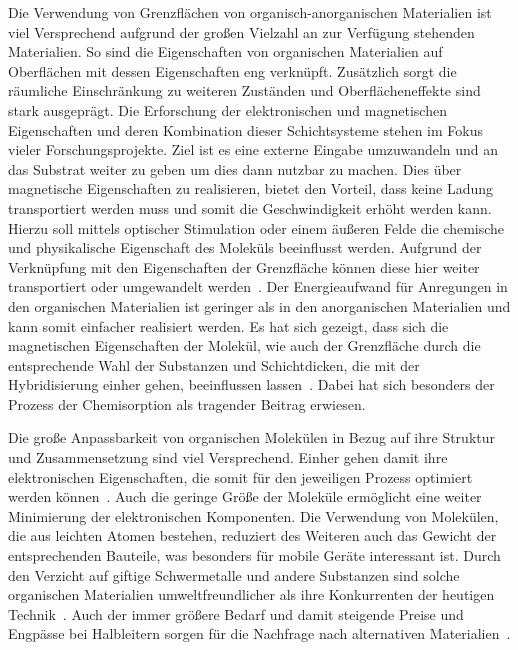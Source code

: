     Die Verwendung von Grenzflächen von organisch-anorganischen Materialien ist viel Versprechend aufgrund der großen Vielzahl an zur Verfügung stehenden Materialien.
    So sind die Eigenschaften von organischen Materialien auf Oberflächen mit dessen Eigenschaften eng verknüpft.
    Zusätzlich sorgt die räumliche Einschränkung zu weiteren Zuständen und Oberflächeneffekte sind stark ausgeprägt.
    Die Erforschung der elektronischen und magnetischen Eigenschaften und deren Kombination dieser Schichtsysteme stehen im Fokus vieler Forschungsprojekte.
    Ziel ist es eine externe Eingabe umzuwandeln und an das Substrat weiter zu geben um dies dann nutzbar zu machen.
    Dies über magnetische Eigenschaften zu realisieren, bietet den Vorteil, dass keine Ladung transportiert werden muss und somit die Geschwindigkeit erhöht werden kann.
    Hierzu soll mittels optischer Stimulation oder einem äußeren Felde die chemische und physikalische Eigenschaft des Moleküls beeinflusst werden.
    Aufgrund der Verknüpfung mit den Eigenschaften der Grenzfläche können diese hier weiter transportiert oder umgewandelt werden~\cite{IF_16}.
    Der Energieaufwand für Anregungen in den organischen Materialien ist geringer als in den anorganischen Materialien und kann somit einfacher realisiert werden.
    Es hat sich gezeigt, dass sich die magnetischen Eigenschaften der Molekül, wie auch der Grenzfläche durch die entsprechende Wahl der Substanzen und Schichtdicken, die mit der Hybridisierung einher gehen, beeinflussen lassen~\cite{IF_16}.
    Dabei hat sich besonders der Prozess der Chemisorption als tragender Beitrag erwiesen.

    Die große Anpassbarkeit von organischen Molekülen in Bezug auf ihre Struktur und Zusammensetzung sind viel Versprechend.
    Einher gehen damit ihre elektronischen Eigenschaften, die somit für den jeweiligen Prozess optimiert werden können~\cite{scholl_chapter_2018}.
    Auch die geringe Größe der Moleküle ermöglicht eine weiter Minimierung der elektronischen Komponenten.
    Die Verwendung von Molekülen, die aus leichten Atomen bestehen, reduziert des Weiteren auch das Gewicht der entsprechenden Bauteile, was besonders für mobile Geräte interessant ist.
    Durch den Verzicht auf giftige Schwermetalle und andere Substanzen sind solche organischen Materialien umweltfreundlicher als ihre Konkurrenten der heutigen Technik~\cite{scholl_chapter_2018}.
    Auch der immer größere Bedarf und damit steigende Preise und Engpässe bei Halbleitern sorgen für die Nachfrage nach alternativen Materialien~\cite{Idealo}.

